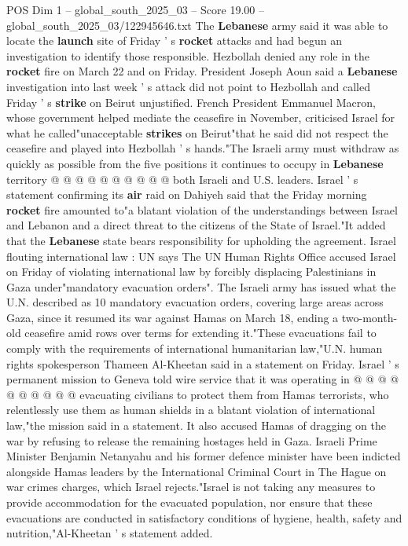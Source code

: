 \begin{textsample}{POS Dim 1 – global\_south\_2025\_03 – Score 19.00 – global\_south\_2025\_03/122945646.txt}
The \textbf{Lebanese} army said it was able to locate the \textbf{launch} site of Friday ' s \textbf{rocket} attacks and had begun an investigation to identify those responsible.
Hezbollah denied any role in the \textbf{rocket} fire on March 22 and on Friday.
President Joseph Aoun said a \textbf{Lebanese} investigation into last week ' s attack did not point to Hezbollah and called Friday ' s \textbf{strike} on Beirut unjustified.
French President Emmanuel Macron, whose government helped mediate the ceasefire in November, criticised Israel for what he called"unacceptable \textbf{strikes} on Beirut"that he said did not respect the ceasefire and played into Hezbollah ' s hands."The Israeli army must withdraw as quickly as possible from the five positions it continues to occupy in \textbf{Lebanese} territory @ @ @ @ @ @ @ @ @ @ both Israeli and U.S. leaders.
Israel ' s statement confirming its \textbf{air} raid on Dahiyeh said that the Friday morning \textbf{rocket} fire amounted to"a blatant violation of the understandings between Israel and Lebanon and a direct threat to the citizens of the State of Israel."It added that the \textbf{Lebanese} state bears responsibility for upholding the agreement.
Israel flouting international law : UN says The UN Human Rights Office accused Israel on Friday of violating international law by forcibly displacing Palestinians in Gaza under"mandatory evacuation orders".
The Israeli army has issued what the U.N. described as 10 mandatory evacuation orders, covering large areas across Gaza, since it resumed its war against Hamas on March 18, ending a two-month-old ceasefire amid rows over terms for extending it."These evacuations fail to comply with the requirements of international humanitarian law,"U.N. human rights spokesperson Thameen Al-Kheetan said in a statement on Friday.
Israel ' s permanent mission to Geneva told wire service that it was operating in @ @ @ @ @ @ @ @ @ @ evacuating civilians to protect them from Hamas terrorists, who relentlessly use them as human shields in a blatant violation of international law,"the mission said in a statement.
It also accused Hamas of dragging on the war by refusing to release the remaining hostages held in Gaza.
Israeli Prime Minister Benjamin Netanyahu and his former defence minister have been indicted alongside Hamas leaders by the International Criminal Court in The Hague on war crimes charges, which Israel rejects."Israel is not taking any measures to provide accommodation for the evacuated population, nor ensure that these evacuations are conducted in satisfactory conditions of hygiene, health, safety and nutrition,"Al-Kheetan ' s statement added.

\end{textsample}
